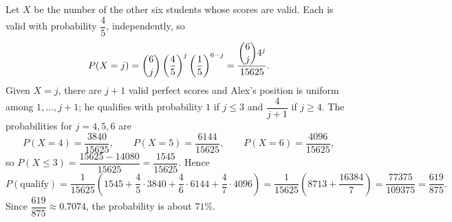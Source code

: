 Let $X$ be the number of the other six students whose scores are valid. Each is valid with probability $\dfrac45$, independently, so
\[P(X=j)=\dbinom6j\left(\dfrac45\right)^j\left(\dfrac15\right)^{6-j}=\dfrac{\dbinom6j4^j}{15625}.\]
Given $X=j$, there are $j+1$ valid perfect scores and Alex's position is uniform among $1,\dots,j+1$; he qualifies with probability $1$ if $j\le3$ and $\dfrac{4}{j+1}$ if $j\ge4$. The probabilities for $j=4,5,6$ are
\[P(X=4)=\dfrac{3840}{15625},\qquad P(X=5)=\dfrac{6144}{15625},\qquad P(X=6)=\dfrac{4096}{15625},\]
so $P(X\le3)=\dfrac{15625-14080}{15625}=\dfrac{1545}{15625}$. Hence
\[P(\text{qualify})=\dfrac{1}{15625}\left(1545+\dfrac45\cdot3840+\dfrac46\cdot6144+\dfrac47\cdot4096\right)=\dfrac{1}{15625}\left(8713+\dfrac{16384}{7}\right)=\dfrac{77375}{109375}=\dfrac{619}{875}.\]
Since $\dfrac{619}{875}\approx0.7074$, the probability is about $\boxed{71\%}$.

